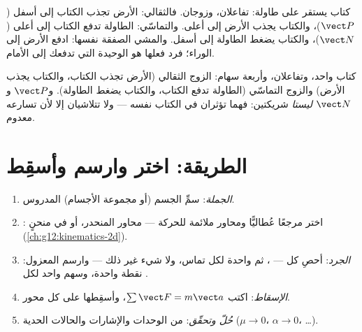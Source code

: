 \begin{example}\label{ex:g12:newtons-laws:book}
كتاب يستقر على طاولة: تفاعلان، وزوجان. فالثقالي: الأرض تجذب
الكتاب إلى أسفل ($\vect P$)، والكتاب يجذب الأرض إلى أعلى. والتماسّي: الطاولة تدفع
الكتاب إلى أعلى ($\vect N$)، والكتاب يضغط الطاولة إلى أسفل. والمشي الصفقة نفسها:
ادفع الأرض إلى الوراء؛ فرد فعلها هو  الوحيدة التي تدفعك إلى الأمام.
\end{example}

\begin{omfigure}

{\small كتاب واحد، وتفاعلان، وأربعة سهام: الزوج الثقالي (الأرض
تجذب الكتاب، والكتاب يجذب الأرض) والزوج التماسّي (الطاولة تدفع
الكتاب، والكتاب يضغط الطاولة). و$\vect P$ و$\vect N$ \emph{ليستا} شريكتين:
فهما تؤثران في الكتاب نفسه --- ولا تتلاشيان إلا لأن تسارعه معدوم.}
\end{omfigure}

\section{الطريقة: اختر وارسم وأسقِط}

\begin{method}\label{met:g12:newtons-laws:method}
\begin{enumerate}
  \item \emph{الجملة}: سمِّ الجسم (أو مجموعة الأجسام) المدروس.
  \item \emph{}: اختر مرجعًا عُطاليًّا ومحاور ملائمة للحركة ---
        محاور المنحدر، أو  في منحنٍ (\cref{ch:g12:kinematics-2d}).
  \item \emph{الجرد}: أحصِ كل  --- ، ثم  واحدة لكل
        تماس، ولا شيء غير ذلك --- وارسم  المعزول: نقطة واحدة، وسهم
        واحد لكل .
  \item \emph{الإسقاط}: اكتب $\sum \vect F = m\vect a$، وأسقِطها على كل محور.
  \item \emph{حُلّ وتحقّق}: من الوحدات والإشارات والحالات الحدية ($\mu \to 0$،
        $\alpha \to 0$، \dots).
\end{enumerate}
\end{method}

